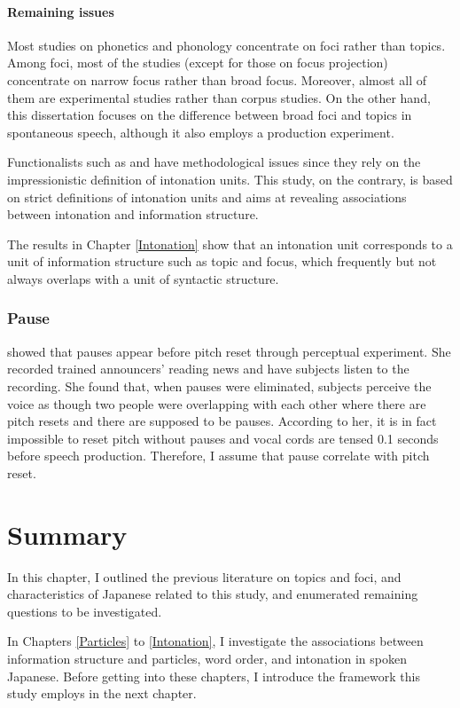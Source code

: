 \paragraph{Remaining issues}

Most studies on phonetics and phonology concentrate on
foci rather than topics.
Among foci, most of the studies (except for those on focus projection) concentrate on narrow focus rather than broad focus.
Moreover, almost all of them are experimental studies rather than
corpus studies.
On the other hand, this dissertation focuses on
the difference between broad foci and topics in spontaneous speech,
although it also employs a production experiment.

Functionalists such as  and 
have methodological issues since they rely on the impressionistic definition of intonation units.
This study, on the contrary, is based on
strict definitions of intonation units and
aims at revealing associations between intonation and information structure.

The results in Chapter \ref{Intonation} show that
an intonation unit corresponds to a unit of information structure such as topic and focus,
which frequently but not always overlaps with a unit of syntactic structure.

\subsubsection{Pause}

 showed that
pauses appear before pitch reset through perceptual experiment.
She recorded trained announcers' reading news and have subjects listen to the recording.
She found that, when pauses were eliminated,
subjects perceive the voice as though two people were overlapping with each other where there are pitch resets and there are supposed to be pauses.
According to her,
it is in fact impossible to reset pitch without pauses and
vocal cords are tensed 0.1 seconds before speech production.
Therefore, I assume that pause correlate with pitch reset.

\section{Summary}

In this chapter,
I outlined the previous literature on topics and foci, and
characteristics of Japanese related to this study,
and enumerated remaining questions to be investigated.

In Chapters \ref{Particles} to \ref{Intonation},
I investigate the associations between information structure and particles, word order, and intonation in spoken Japanese.
Before getting into these chapters,
I introduce the framework this study employs in the next chapter.




